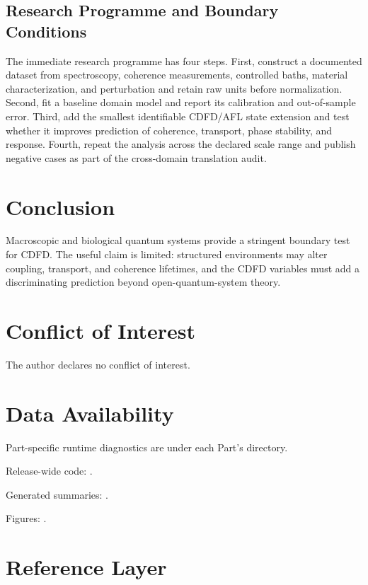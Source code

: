 \documentclass[11pt,a4paper]{article}
\begin{document}
\subsection{Research Programme and Boundary Conditions}

The immediate research programme has four steps. First, construct a documented
dataset from spectroscopy, coherence measurements, controlled baths, material characterization, and perturbation and retain raw units before normalization.
Second, fit a baseline domain model and report its calibration and out-of-sample
error. Third, add the smallest identifiable CDFD/AFL state extension and test
whether it improves prediction of coherence, transport, phase stability, and response. Fourth, repeat the
analysis across the declared scale range and publish negative cases as part of
the cross-domain translation audit.


\section{Conclusion}
Macroscopic and biological quantum systems provide a stringent boundary test for CDFD. The useful claim is limited: structured environments may alter coupling, transport, and coherence lifetimes, and the CDFD variables must add a discriminating prediction beyond open-quantum-system theory.
\section*{Conflict of Interest} The author declares no conflict of interest.
\section*{Data Availability}
Part-specific runtime diagnostics are under each Part's  directory.

Release-wide code: .

Generated summaries: .

Figures: .


\section{Reference Layer}


\end{document}
